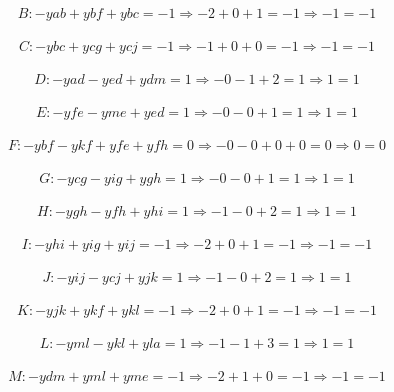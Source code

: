 \documentclass[a4paper]{report}
\begin{document}
\begin{multline}
B: - yab + ybf + ybc = -1
\Rightarrow - 2 + 0 + 1 = -1
\Rightarrow -1 = -1
\end{multline}

\begin{multline}
C: - ybc + ycg + ycj = -1
\Rightarrow - 1 + 0 + 0 = -1
\Rightarrow -1 = -1
\end{multline}

\begin{multline}
D: - yad - yed + ydm = 1
\Rightarrow - 0 - 1 + 2 = 1
\Rightarrow 1 = 1
\end{multline}

\begin{multline}
E: - yfe - yme + yed = 1
\Rightarrow - 0 - 0 + 1 = 1
\Rightarrow 1 = 1
\end{multline}

\begin{multline}
F: - ybf - ykf + yfe + yfh = 0
\Rightarrow - 0 - 0 + 0 + 0 = 0
\Rightarrow 0 = 0
\end{multline}

\begin{multline}
G: - ycg - yig + ygh = 1
\Rightarrow - 0 - 0 + 1 = 1
\Rightarrow 1 = 1
\end{multline}

\begin{multline}
H: - ygh - yfh + yhi = 1
\Rightarrow - 1 - 0 + 2 = 1
\Rightarrow 1 = 1
\end{multline}

\begin{multline}
I: - yhi + yig + yij = -1
\Rightarrow - 2 + 0 + 1 = -1
\Rightarrow -1 = -1
\end{multline}

\begin{multline}
J: - yij - ycj + yjk = 1
\Rightarrow - 1 - 0 + 2 = 1
\Rightarrow 1 = 1
\end{multline}

\begin{multline}
K: - yjk + ykf + ykl = -1
\Rightarrow - 2 + 0 + 1 = -1
\Rightarrow -1 = -1
\end{multline}

\begin{multline}
L: - yml - ykl + yla = 1
\Rightarrow - 1 - 1 + 3 = 1
\Rightarrow 1 = 1
\end{multline}

\begin{multline}
M: - ydm + yml + yme = -1
\Rightarrow - 2 + 1 + 0 = -1
\Rightarrow -1 = -1
\end{multline}
\end{document}

